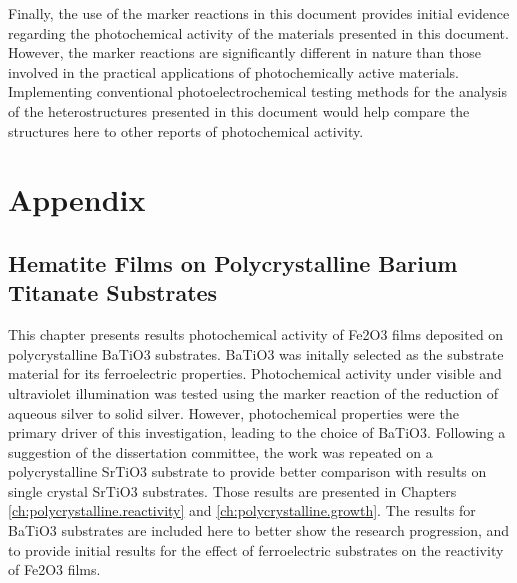 \documentclass[12pt,%
              twoside,
               letterpaper]{uiothesis}
\begin{document}
Finally, the use of the marker reactions in this document provides initial evidence
regarding the photochemical activity of the materials presented in this document. However,
the marker reactions are significantly different in nature than those involved in the
practical applications of photochemically active materials. Implementing conventional
photoelectrochemical testing methods for the analysis of the heterostructures presented in
this document would help compare the structures here to other reports of photochemical
activity. 


 
	
	\renewcommand{\bibname}{References}
	
%	

 	 
 		
\part{Appendix}

\chapter{Hematite Films on Polycrystalline Barium Titanate Substrates}
\label{ch:polycrystalline.reactivity.old}


This chapter presents results photochemical activity of 
Fe2O3 films deposited on polycrystalline BaTiO3 substrates. 
BaTiO3 was initally selected as the substrate material for its 
ferroelectric properties. Photochemical activity under visible and 
ultraviolet illumination was tested using the marker reaction of the 
reduction of aqueous silver to solid silver. However, photochemical 
properties were the primary driver of this investigation, leading to 
the choice of BaTiO3. Following a suggestion of the dissertation 
committee, the work was repeated on a polycrystalline SrTiO3 
substrate to provide better comparison with results on single crystal 
SrTiO3 substrates. Those results are presented in Chapters~
\ref{ch:polycrystalline.reactivity} and \ref{ch:polycrystalline.growth}. The results for BaTiO3 
substrates are included here to better show the research progression, 
and to provide initial results for the effect of ferroelectric 
substrates on the reactivity of Fe2O3 films.
\end{document}
